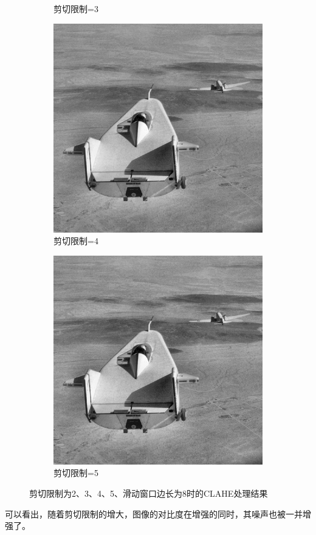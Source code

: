 \documentclass[a4paper]{ctexart}
\newcommand{\outwfour}{0.23\textwidth}
\begin{document}
\begin{spacing}{1.35}
\begin{figure}[htbp]
\begin{subfigure}[t]{\outwfour}
			\caption{剪切限制=3}
		\end{subfigure}
		\begin{subfigure}[t]{\outwfour}
			\centering
			\includegraphics[width=\textwidth]{figure/1_clip_limit_4.png}
			\caption{剪切限制=4}
		\end{subfigure}
		\begin{subfigure}[t]{\outwfour}
			\centering
			\includegraphics[width=\textwidth]{figure/1_clip_limit_5.png}
			\caption{剪切限制=5}
		\end{subfigure}
		\caption{剪切限制为2、3、4、5、滑动窗口边长为8时的CLAHE处理结果}
		\label{fig:CLAHE2}
	\end{figure}
	可以看出，随着剪切限制的增大，图像的对比度在增强的同时，其噪声也被一并增强了。


\end{spacing}
\end{document}
